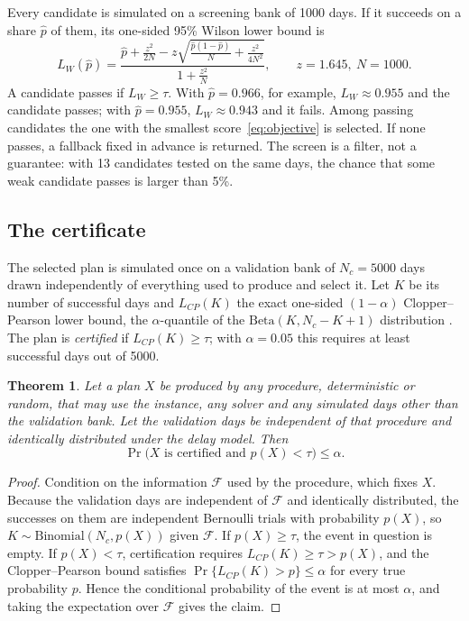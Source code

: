 \documentclass[11pt,a4paper]{article}
\newtheorem{theorem}{Theorem}
\theoremstyle{remark}
\begin{document}
Every candidate is simulated on a screening bank of 1000 days. If it succeeds on a
share $\hat p$ of them, its one-sided 95\% Wilson lower bound is
\begin{equation}
 L_W(\hat p)=\frac{\hat p+\frac{z^2}{2N}-z\sqrt{\frac{\hat p(1-\hat p)}{N}+\frac{z^2}{4N^2}}}{1+\frac{z^2}{N}},
 \qquad z=1.645,\ N=1000. \label{eq:wilson}
\end{equation}
A candidate passes if $L_W\ge\tau$. With $\hat p=0.966$, for example, $L_W\approx
0.955$ and the candidate passes; with $\hat p=0.955$, $L_W\approx0.943$ and it fails.
Among passing candidates the one with the smallest score~\eqref{eq:objective} is
selected. If none passes, a fallback fixed in advance is returned. The screen is a
filter, not a guarantee: with 13 candidates tested on the same days, the chance
that some weak candidate passes is larger than 5\%.

\subsection{The certificate}

The selected plan is simulated once on a validation bank of $N_c=5000$ days drawn
independently of everything used to produce and select it. Let $K$ be its number of
successful days and $L_{CP}(K)$ the exact one-sided $(1-\alpha)$ Clopper--Pearson
lower bound, the $\alpha$-quantile of the $\mathrm{Beta}(K,N_c-K+1)$ distribution
\citep{clopper1934}. The plan is \emph{certified} if $L_{CP}(K)\ge\tau$; with
$\alpha=0.05$ this requires at least \CertMinSuccesses{} successful days out of 5000.

\begin{theorem}\label{thm:cert}
Let a plan $X$ be produced by any procedure, deterministic or random, that may use
the instance, any solver and any simulated days other than the validation bank.
Let the validation days be independent of that procedure and identically
distributed under the delay model. Then
\[
 \Pr\bigl(X\text{ is certified and }p(X)<\tau\bigr)\le\alpha .
\]
\end{theorem}

\begin{proof}
Condition on the information $\mathcal F$ used by the procedure, which fixes $X$.
Because the validation days are independent of $\mathcal F$ and identically
distributed, the successes on them are independent Bernoulli trials with
probability $p(X)$, so $K\sim\mathrm{Binomial}(N_c,p(X))$ given $\mathcal F$. If
$p(X)\ge\tau$, the event in question is empty. If $p(X)<\tau$, certification
requires $L_{CP}(K)\ge\tau>p(X)$, and the Clopper--Pearson bound satisfies
$\Pr\{L_{CP}(K)>p\}\le\alpha$ for every true probability $p$. Hence the
conditional probability of the event is at most $\alpha$, and taking the
expectation over $\mathcal F$ gives the claim.
\end{proof}
\end{document}

